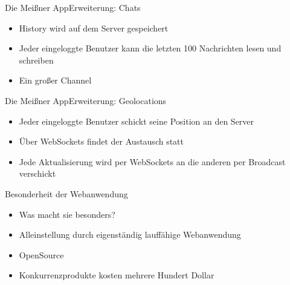 \begin{frame}{Die Meißner App}{Erweiterung: Chats}
	\begin{itemize}
		\item History wird auf dem Server gespeichert
		\item Jeder eingeloggte Benutzer kann die letzten 100 Nachrichten lesen und schreiben
		\item Ein großer Channel
	\end{itemize}
\end{frame}

\begin{frame}{Die Meißner App}{Erweiterung: Geolocations}
	\begin{itemize}
		\item Jeder eingeloggte Benutzer schickt seine Position an den Server
		\item Über WebSockets findet der Austausch statt
		\item Jede Aktualisierung wird per WebSockets an die anderen per Broadcast verschickt
	\end{itemize}
\end{frame}

\begin{frame}{Besonderheit der Webanwendung}
	\begin{itemize}
		\item Was macht sie besonders?
		\item Alleinstellung durch eigenständig lauffähige Webanwendung
		\item OpenSource
		\item Konkurrenzprodukte kosten mehrere Hundert Dollar
	\end{itemize}
\end{frame}